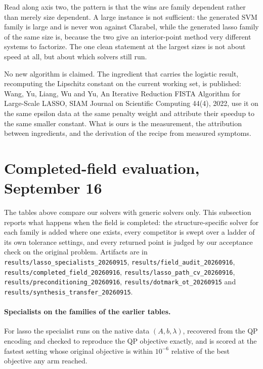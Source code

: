 \documentclass[11pt]{article}
\begin{document}
Read along axis two, the pattern is that the wins are family dependent rather
than merely size dependent. A large instance is not sufficient: the generated
SVM family is large and is never won against Clarabel, while the generated
lasso family of the same size is, because the two give an interior-point
method very different systems to factorize. The one clean statement at the
largest sizes is not about speed at all, but about which solvers still run.

No new algorithm is claimed. The ingredient that carries the logistic result,
recomputing the Lipschitz constant on the current working set, is published:
Wang, Yu, Liang, Wu and Yu, An Iterative Reduction FISTA Algorithm for
Large-Scale LASSO, SIAM Journal on Scientific Computing 44(4), 2022, use it on
the same epsilon data at the same penalty weight and attribute their speedup
to the same smaller constant. What is ours is the measurement, the attribution
between ingredients, and the derivation of the recipe from measured symptoms.

\section{Completed-field evaluation, September 16}
\label{app:field}

The tables above compare our solvers with generic solvers only. This subsection
reports what happens when the field is completed: the structure-specific solver
for each family is added where one exists, every competitor is swept over a
ladder of its own tolerance settings, and every returned point is judged by our
acceptance check on the original problem. Artifacts are in
\texttt{results/lasso\_specialists\_20260915}, \texttt{results/field\_audit\_20260916},
\texttt{results/completed\_field\_20260916}, \texttt{results/lasso\_path\_cv\_20260916},
\texttt{results/preconditioning\_20260916}, \texttt{results/dotmark\_ot\_20260915}
and \texttt{results/synthesis\_transfer\_20260915}.

\paragraph{Specialists on the families of the earlier tables.}
For lasso the specialist runs on the native data $(A, b, \lambda)$, recovered
from the QP encoding and checked to reproduce the QP objective exactly, and is
scored at the fastest setting whose original objective is within $10^{-6}$
relative of the best objective any arm reached.
\end{document}
